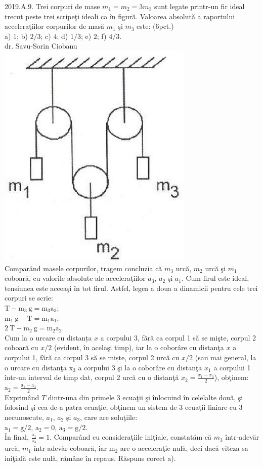 2019.A.9. Trei corpuri de mase $m_{1}=m_{2}=3 m_{3}$ sunt legate printr-un fir ideal trecut peste trei scripeţi ideali ca în figură. Valoarea absolută a raportului acceleraţiilor corpurilor de masă $m_{1}$ şi $m_{3}$ este: (6pct.)\\ a) $1$; b) $2 / 3$; c) $4$; d) $1 / 3$; e) $2$; f) $4 / 3$.\\ dr. Savu-Sorin Ciobanu\\ \includegraphics[width=0.4\linewidth]{images/2025_08_19_7d65f00c22d2f38e2422g-02}\\ Comparând masele corpurilor, tragem concluzia că $m_{3}$ urcă, $m_{2}$ urcă şi $m_{1}$ coboară, cu valorile absolute ale acceleraţiilor $a_{3}$, $a_{2}$ şi $a_{1}$. Cum firul este ideal, tensiunea este aceeaşi în tot firul. Astfel, legea a doua a dinamicii pentru cele trei corpuri se scrie:\\ $\mathrm{T}-\mathrm{m}_{3} \mathrm{~g}=\mathrm{m}_{3} \mathrm{a}_{3}$;\\ $\mathrm{m}_{1} \mathrm{~g}-\mathrm{T}=\mathrm{m}_{1} \mathrm{a}_{1}$;\\ $2 \mathrm{~T}-\mathrm{m}_{2} \mathrm{~g}=\mathrm{m}_{2} \mathrm{a}_{2}$.\\ Cum la o urcare cu distanța $x$ a corpului 3, fără ca corpul 1 să se mişte, corpul 2 coboară cu $x / 2$ (evident, în acelaşi timp), iar la o coborâre cu distanţa $x$ a corpului 1, fără ca corpul 3 să se miște, corpul 2 urcă cu $x / 2$ (sau mai general, la o urcare cu distanţa $\mathrm{x}_{3}$ a corpului 3 şi la o coborâre cu distanţa $x_{1}$ a corpului 1 într-un interval de timp dat, corpul 2 urcă cu o distanţă $x_{2}=\frac{x_{1}-x_{3}}{2}$), obţinem:\\ $\mathrm{a}_{2}=\frac{\mathrm{a}_{1}-\mathrm{a}_{3}}{2}$.\\ Exprimând $T$ dintr-una din primele 3 ecuaţii şi înlocuind în celelalte două, şi folosind şi cea de-a patra ecuaţie, obţinem un sistem de 3 ecuaţii liniare cu 3 necunoscute, $a_{1}$, $a_{2}$ și $a_{3}$, care are soluţiile:\\ $\mathrm{a}_{1}=\mathrm{g} / 2$, $\mathrm{a}_{2}=0$, $\mathrm{a}_{3}=\mathrm{g} / 2$.\\ În final, $\frac{\mathrm{a}_{1}}{\mathrm{a}_{3}}=1$. Comparând cu consideraţiile iniţiale, constatăm că $m_{3}$ într-adevăr urcă, $m_{1}$ într-adevăr coboară, iar $\mathrm{m}_{2}$ are o acceleraţie nulă, deci dacă viteza sa iniţială este nulă, rămâne în repaus. Răspuns corect a).\\

